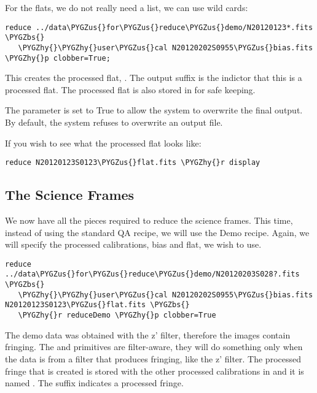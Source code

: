 \documentclass[letterpaper,10pt,english]{sphinxmanual}
\def\PYGZbs{\char`\\}
\def\PYGZus{\char`\_}
\def\PYGZhy{\char`\-}
\begin{document}
For the flats, we do not really need a list, we can use wild cards:

\begin{Verbatim}[commandchars=\\\{\}]
reduce ../data\PYGZus{}for\PYGZus{}reduce\PYGZus{}demo/N20120123*.fits \PYGZbs{}
   \PYGZhy{}\PYGZhy{}user\PYGZus{}cal N20120202S0955\PYGZus{}bias.fits \PYGZhy{}p clobber=True;
\end{Verbatim}

This creates the processed flat, .  The output suffix
 is the indictor that this is a processed flat.  The processed flat is also
stored in  for safe keeping.

The  parameter is set to True to allow the system to overwrite the final
output.  By default, the system refuses to overwrite an output file.

If you wish to see what the processed flat looks like:

\begin{Verbatim}[commandchars=\\\{\}]
reduce N20120123S0123\PYGZus{}flat.fits \PYGZhy{}r display
\end{Verbatim}


\subsection{The Science Frames}
\label{appendices/appendix_demo:the-science-frames}
We now have all the pieces required to reduce the science frames.  This time,
instead of using the standard QA recipe, we will use the Demo recipe.  Again,
we will specify the processed calibrations, bias and flat, we wish to use.

\begin{Verbatim}[commandchars=\\\{\}]
reduce ../data\PYGZus{}for\PYGZus{}reduce\PYGZus{}demo/N20120203S028?.fits \PYGZbs{}
   \PYGZhy{}\PYGZhy{}user\PYGZus{}cal N20120202S0955\PYGZus{}bias.fits N20120123S0123\PYGZus{}flat.fits \PYGZbs{}
   \PYGZhy{}r reduceDemo \PYGZhy{}p clobber=True
\end{Verbatim}

The demo data was obtained with the z' filter, therefore the images contain fringing.
The  and  primitives are filter-aware, they will do
something only when the data is from a filter that produces fringing, like the z'
filter.  The processed fringe that is created is stored with the other processed
calibrations in  and it is named
. The  suffix indicates a processed fringe.
\end{document}
